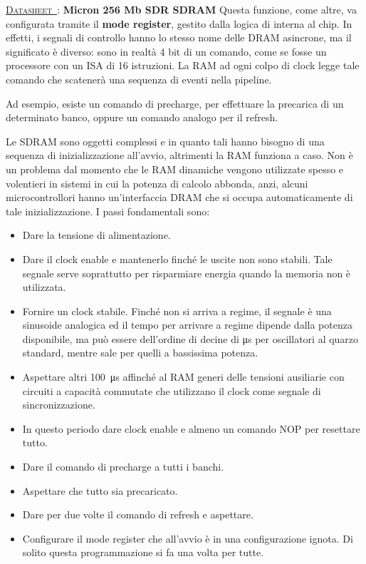 \documentclass[11pt,4paper]{report}
\newcounter{datasheetcnt}
\renewcommand{\thedatasheetcnt}{\arabic{datasheetcnt}}
\newenvironment{datasheet}[2]{\refstepcounter{datasheetcnt}\par\bigskip\medskip \label{#2}
	\noindent \underline{\textsc{Datasheet~\thedatasheetcnt}}: \textbf{#1} \newline}{\medskip}
\begin{document}
\begin{datasheet}{Micron 256 Mb SDR SDRAM}{}
Questa funzione, come altre, va configurata tramite il \textbf{mode register}, gestito dalla logica di interna al chip. In effetti, i segnali di controllo hanno lo stesso nome delle DRAM asincrone, ma il significato è diverso: sono in realtà 4 bit di un comando, come se fosse un processore con un ISA di 16 istruzioni. La RAM ad ogni colpo di clock legge tale comando che scatenerà una sequenza di eventi nella pipeline.

Ad esempio, esiste un comando di precharge, per effettuare la precarica di un determinato banco, oppure un comando analogo per il refresh.

Le SDRAM sono oggetti complessi e in quanto tali hanno bisogno di una sequenza di inizializzazione all'avvio, altrimenti la RAM funziona a caso. Non è un problema dal momento che le RAM dinamiche vengono utilizzate spesso e volentieri in sistemi in cui la potenza di calcolo abbonda, anzi, alcuni microcontrollori hanno un'interfaccia DRAM che si occupa automaticamente di tale inizializzazione. I passi fondamentali sono:
\begin{itemize}
	\item Dare la tensione di alimentazione.
	\item Dare il clock enable e mantenerlo finché le uscite non sono stabili. Tale segnale serve soprattutto per risparmiare energia quando la memoria non è utilizzata.
	\item Fornire un clock stabile. Finché non si arriva a regime, il segnale è una sinusoide analogica ed il tempo per arrivare a regime dipende dalla potenza disponibile, ma può essere dell'ordine di decine di \si{\micro\second} per oscillatori al quarzo standard, mentre sale per quelli a bassissima potenza.
	\item Aspettare altri \SI{100}{\micro\second} affinché al RAM generi delle tensioni ausiliarie con circuiti a capacità commutate che utilizzano il clock come segnale di sincronizzazione.
	\item In questo periodo dare clock enable e almeno un comando NOP per resettare tutto.
	\item Dare il comando di precharge a tutti i banchi.
	\item Aspettare che tutto sia precaricato.
	\item Dare per due volte il comando di refresh e aspettare.
	\item Configurare il mode register che all'avvio è in una configurazione ignota. Di solito questa programmazione si fa una volta per tutte.
\end{itemize}


\end{datasheet}
\end{document}
